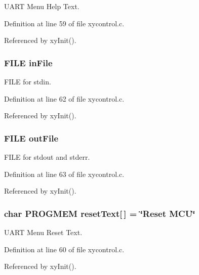 U\-A\-R\-T Menu Help Text. 



Definition at line 59 of file xycontrol.\-c.



Referenced by xy\-Init().

\hypertarget{group__xycontrol_gaad0ab56da43b41bbfeeaa3d1eca70e9c}{
\subsubsection[{in\-File}]{\setlength{\rightskip}{0pt plus 5cm}F\-I\-L\-E in\-File}}\label{group__xycontrol_gaad0ab56da43b41bbfeeaa3d1eca70e9c}


F\-I\-L\-E for stdin. 



Definition at line 62 of file xycontrol.\-c.



Referenced by xy\-Init().

\hypertarget{group__xycontrol_gaa9e0cac6f45e381f488c1dd9a8418ca2}{
\subsubsection[{out\-File}]{\setlength{\rightskip}{0pt plus 5cm}F\-I\-L\-E out\-File}}\label{group__xycontrol_gaa9e0cac6f45e381f488c1dd9a8418ca2}


F\-I\-L\-E for stdout and stderr. 



Definition at line 63 of file xycontrol.\-c.



Referenced by xy\-Init().

\hypertarget{group__xycontrol_ga27915b4caf41f74542980a4ea0f1726a}{
\subsubsection[{reset\-Text}]{\setlength{\rightskip}{0pt plus 5cm}char P\-R\-O\-G\-M\-E\-M reset\-Text\mbox{[}$\,$\mbox{]} = \char`\"{}Reset M\-C\-U\char`\"{}}}\label{group__xycontrol_ga27915b4caf41f74542980a4ea0f1726a}


U\-A\-R\-T Menu Reset Text. 



Definition at line 60 of file xycontrol.\-c.



Referenced by xy\-Init().

